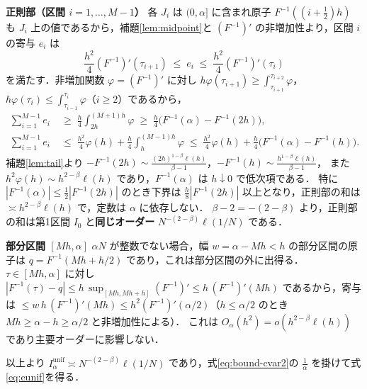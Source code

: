 \documentclass[a4paper,10pt]{jsarticle}
\makeatletter
\theoremstyle{definition}
\renewenvironment{proof}[1][\proofname]{\par
  \pushQED{\qed}%
  \normalfont \topsep6\p@\@plus6\p@\relax
  \trivlist
  \item[\hskip\labelsep\textbf{#1}]\ignorespaces
}{%
  \popQED\endtrivlist\@endpefalse
}
\renewcommand{\proofname}{証明}
\newcommand{\Finv}{F^{-1}}
\newcommand{\Iunif}{I_\alpha^{\mathrm{unif}}}
\makeatother
\begin{document}
\begin{proof}
\noindent\textbf{正則部（区間 $i=1,\dots,M-1$）}
各 $J_i$ は $(0,\alpha]$ に含まれ原子 $\Finv((i+\frac12)h)$ も $J_i$ 上の値であるから，補題\ref{lem:midpoint}と $(\Finv)'$ の非増加性より，区間 $i$ の寄与 $e_i$ は
\begin{equation*}
  \frac{h^2}{4}(\Finv)'(\tau_{i+1})\;\le\;e_i\;\le\;\frac{h^2}{4}(\Finv)'(\tau_i)
\end{equation*}
を満たす．非増加関数 $\varphi=(\Finv)'$ に対し $h\varphi(\tau_{i+1})\ge\int_{\tau_{i+1}}^{\tau_{i+2}}\varphi$，$h\varphi(\tau_i)\le\int_{\tau_{i-1}}^{\tau_i}\varphi$（$i\ge2$）であるから，
\begin{align*}
\sum_{i=1}^{M-1}e_i
&\;\ge\;\frac h4\int_{2h}^{(M+1)h}\varphi\;\ge\;\frac h4\bigl(\Finv(\alpha)-\Finv(2h)\bigr),\\
\sum_{i=1}^{M-1}e_i
&\;\le\;\frac{h^2}{4}\varphi(h)+\frac h4\int_{h}^{(M-1)h}\varphi\;\le\;\frac{h^2}{4}\varphi(h)+\frac h4\bigl(\Finv(\alpha)-\Finv(h)\bigr).
\end{align*}
補題\ref{lem:tail}より $-\Finv(2h)\sim\frac{(2h)^{1-\beta}\ell(h)}{\beta-1}$，$-\Finv(h)\sim\frac{h^{1-\beta}\ell(h)}{\beta-1}$，
また $h^2\varphi(h)\sim h^{2-\beta}\ell(h)$ であり，$\Finv(\alpha)$ は $h\downarrow0$ で低次項である．
特に $|\Finv(\alpha)|\le\frac12|\Finv(2h)|$ のとき下界は $\frac h8|\Finv(2h)|$ 以上となり，正則部の和は $\asymp h^{2-\beta}\ell(h)$ で，定数は $\alpha$ に依存しない．
$\beta-2=-(2-\beta)$ より，正則部の和は第1区間 $I_0$ と\textbf{同じオーダー} $N^{-(2-\beta)}\ell(1/N)$ である．

\noindent\textbf{部分区間 $[Mh,\alpha]$}
$\alpha N$ が整数でない場合，幅 $w=\alpha-Mh<h$ の部分区間の原子は $q=\Finv(Mh+h/2)$ であり，これは部分区間の外に出得る．
$\tau\in[Mh,\alpha]$ に対し $|\Finv(\tau)-q|\le h\,\sup_{[Mh,Mh+h]}(\Finv)'\le h\,(\Finv)'(Mh)$ であるから，寄与は
$\le w\,h\,(\Finv)'(Mh)\le h^2(\Finv)'(\alpha/2)$（$h\le\alpha/2$ のとき $Mh\ge\alpha-h\ge\alpha/2$ と非増加性による）．
これは $O_\alpha(h^2)=o(h^{2-\beta}\ell(h))$ であり主要オーダーに影響しない．

以上より $\Iunif\asymp N^{-(2-\beta)}\ell(1/N)$ であり，式\eqref{eq:bound-cvar2}の $\frac1\alpha$ を掛けて式\eqref{eq:eunif}を得る．
\end{proof}
\end{document}
